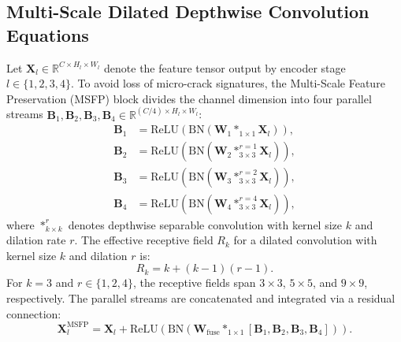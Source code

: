 \documentclass{ieeeaccess}
\begin{document}
\subsection{Multi-Scale Dilated Depthwise Convolution Equations}
Let $\mathbf{X}_l \in \mathbb{R}^{C \times H_l \times W_l}$ denote the feature tensor output by encoder stage $l \in \{1, 2, 3, 4\}$. To avoid loss of micro-crack signatures, the Multi-Scale Feature Preservation (MSFP) block divides the channel dimension into four parallel streams $\mathbf{B}_1, \mathbf{B}_2, \mathbf{B}_3, \mathbf{B}_4 \in \mathbb{R}^{(C/4) \times H_l \times W_l}$:
\begin{align}
  \mathbf{B}_1 &= \text{ReLU}\left(\text{BN}\left(\mathbf{W}_1 *_{1\times 1} \mathbf{X}_l\right)\right), \label{eq:msfp_b1} \\
  \mathbf{B}_2 &= \text{ReLU}\left(\text{BN}\left(\mathbf{W}_2 *_{3\times 3}^{r=1} \mathbf{X}_l\right)\right), \label{eq:msfp_b2} \\
  \mathbf{B}_3 &= \text{ReLU}\left(\text{BN}\left(\mathbf{W}_3 *_{3\times 3}^{r=2} \mathbf{X}_l\right)\right), \label{eq:msfp_b3} \\
  \mathbf{B}_4 &= \text{ReLU}\left(\text{BN}\left(\mathbf{W}_4 *_{3\times 3}^{r=4} \mathbf{X}_l\right)\right), \label{eq:msfp_b4}
\end{align}
where $*_{k\times k}^{r}$ denotes depthwise separable convolution with kernel size $k$ and dilation rate $r$. The effective receptive field $R_k$ for a dilated convolution with kernel size $k$ and dilation $r$ is:
\begin{equation}
  R_k = k + (k - 1)(r - 1).
  \label{eq:receptive_field}
\end{equation}
For $k=3$ and $r \in \{1, 2, 4\}$, the receptive fields span $3 \times 3$, $5 \times 5$, and $9 \times 9$, respectively. The parallel streams are concatenated and integrated via a residual connection:
\begin{equation}
  \mathbf{X}_l^{\text{MSFP}} = \mathbf{X}_l + \text{ReLU}\left(\text{BN}\left(\mathbf{W}_{\text{fuse}} *_{1\times 1} [\mathbf{B}_1, \mathbf{B}_2, \mathbf{B}_3, \mathbf{B}_4]\right)\right).
  \label{eq:msfp_fuse}
\end{equation}
\end{document}
